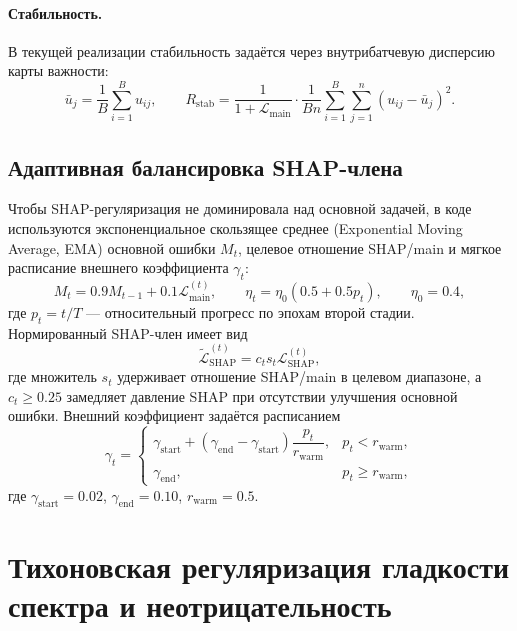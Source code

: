 \paragraph{Стабильность.}
В текущей реализации стабильность задаётся через внутрибатчевую дисперсию карты важности:
\begin{equation}
\bar{u}_j = \frac{1}{B}\sum_{i=1}^{B} u_{ij},
\qquad
R_{\mathrm{stab}} = \frac{1}{1 + \mathcal{L}_{\mathrm{main}}}
\cdot
\frac{1}{Bn}\sum_{i=1}^{B}\sum_{j=1}^{n}(u_{ij} - \bar{u}_j)^2.
\end{equation}

\subsection{Адаптивная балансировка SHAP-члена}

Чтобы SHAP-регуляризация не доминировала над основной задачей, в коде используются экспоненциальное скользящее среднее (Exponential Moving Average, EMA) основной ошибки $M_t$, целевое отношение SHAP/main и мягкое расписание внешнего коэффициента $\gamma_t$:
\begin{equation}
M_t = 0.9 M_{t-1} + 0.1\mathcal{L}_{\mathrm{main}}^{(t)},
\qquad
\eta_t = \eta_0(0.5 + 0.5p_t),
\qquad
\eta_0 = 0.4,
\end{equation}
где $p_t = t/T$ --- относительный прогресс по эпохам второй стадии. Нормированный SHAP-член имеет вид
\begin{equation}
\widetilde{\mathcal{L}}_{\mathrm{SHAP}}^{(t)} = c_t s_t \mathcal{L}_{\mathrm{SHAP}}^{(t)},
\end{equation}
где множитель $s_t$ удерживает отношение SHAP/main в целевом диапазоне, а $c_t \ge 0.25$ замедляет давление SHAP при отсутствии улучшения основной ошибки. Внешний коэффициент задаётся расписанием
\begin{equation}
\gamma_t =
\begin{cases}
\gamma_{\mathrm{start}} + (\gamma_{\mathrm{end}} - \gamma_{\mathrm{start}})\dfrac{p_t}{r_{\mathrm{warm}}}, & p_t < r_{\mathrm{warm}},\\[8pt]
\gamma_{\mathrm{end}}, & p_t \ge r_{\mathrm{warm}},
\end{cases}
\end{equation}
где $\gamma_{\mathrm{start}}=0.02$, $\gamma_{\mathrm{end}}=0.10$, $r_{\mathrm{warm}}=0.5$.

\section{Тихоновская регуляризация гладкости спектра и неотрицательность}

